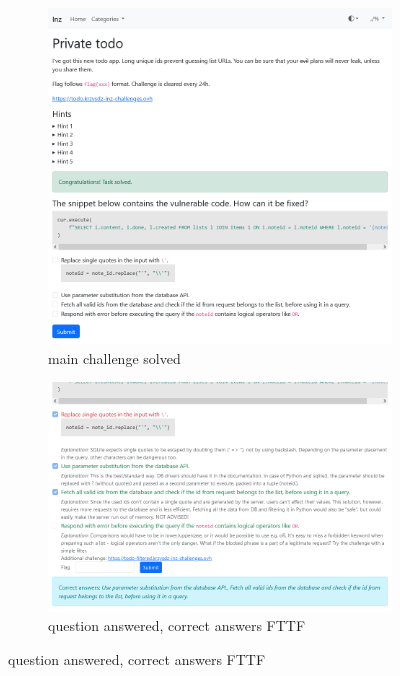 \begin{figure}
    \begin{subfigure}{0.48\textwidth}
        \includegraphics[width=\textwidth]{img/manual-task-solved.png}
        \caption{main challenge solved}
        \label{fig:manual-task-solved}
    \end{subfigure}
    \hfill
    \begin{subfigure}{0.48\textwidth}
        \includegraphics[width=\textwidth]{img/manual-task-answered.png}
        \caption{question answered, correct answers FTTF}
        \label{fig:manual-task-answered}
    \end{subfigure}


\end{figure}
